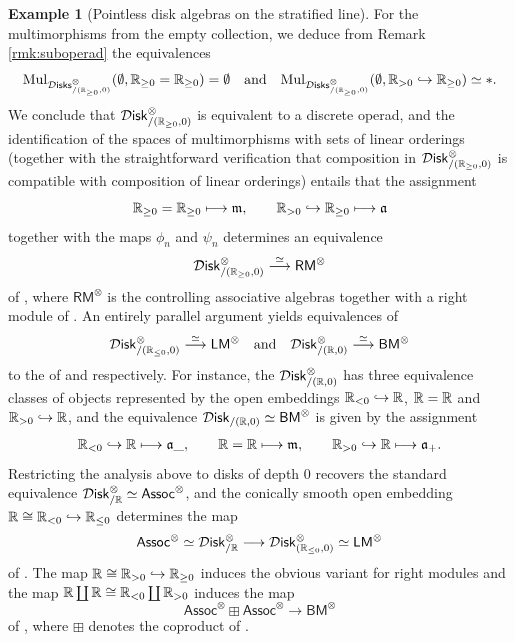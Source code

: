 \documentclass[10pt, reqno, twoside
, final
]{amsart}
\numberwithin{equation}{subsection}%
\theoremstyle{definition}
\theoremstyle{definition}
\theoremstyle{definition}
\theoremstyle{definition}
\theoremstyle{definition}
\theoremstyle{definition}
\theoremstyle{definition}
\theoremstyle{definition}
\theoremstyle{definition}
\theoremstyle{plain}
\theoremstyle{definition}
\theoremstyle{plain}
\theoremstyle{definition}
\theoremstyle{plain}
\theoremstyle{definition}
\theoremstyle{definition}
\theoremstyle{plain}
\theoremstyle{plain}
\theoremstyle{definition}
\newtheorem{ex}[defn]{Example}
\theoremstyle{plain}
\theoremstyle{plain}
\theoremstyle{plain}
\begin{document}
\begin{ex}[Pointless disk algebras on the stratified line]
For the multimorphisms from the empty collection, we deduce from  Remark \ref{rmk:suboperad} the equivalences 
\[ \mathrm{Mul}_{\mathcal{D}\mathsf{isks}^{\otimes}_{/(\mathbb{R}_{\geq 0},0)}}(\emptyset,\mathbb{R}_{\geq 0}=\mathbb{R}_{\geq 0})=\emptyset \quad\text{and}\quad \mathrm{Mul}_{\mathcal{D}\mathsf{isks}^{\otimes}_{/(\mathbb{R}_{\geq 0},0)}}(\emptyset,\mathbb{R}_{> 0}\hookrightarrow \mathbb{R}_{\geq 0})\simeq *.  \]
We conclude that $\mathcal{D}\mathsf{isk}_{/(\mathbb{R}_{\geq 0},0)}^{\otimes}$ is equivalent to a discrete operad, and the identification of the spaces of multimorphisms with sets of linear orderings (together with the straightforward verification that composition in $\mathcal{D}\mathsf{isk}_{/(\mathbb{R}_{\geq 0},0)}^{\otimes}$ is compatible with composition of linear orderings) entails that the assignment
\[  \mathbb{R}_{\geq 0}=\mathbb{R}_{\geq0}\longmapsto \mathfrak{m},\quad \quad \mathbb{R}_{>0}\hookrightarrow \mathbb{R}_{\geq0} \longmapsto \mathfrak{a}  \]
together with the maps $\phi_n$ and $\psi_n$ determines an equivalence
\[ \mathcal{D}\mathsf{isk}_{/(\mathbb{R}_{\geq 0},0)}^{\otimes}\overset{\simeq}{\longrightarrow} \mathsf{RM}^{\otimes} \]
of \infopst, where $\mathsf{RM}^{\otimes}$ is the \infop controlling associative algebras together with a right module of \cite[Variant 4.2.1.36]{LurHA}. An entirely parallel argument yields equivalences of \infops 
\[ \mathcal{D}\mathsf{isk}^{\otimes}_{/(\mathbb{R}_{\leq 0},0)}\overset{\simeq}{\longrightarrow} \mathsf{LM}^{\otimes} \quad\text{and}\quad \mathcal{D}\mathsf{isk}_{/(\mathbb{R},0)}^{\otimes}\overset{\simeq}{\longrightarrow} \mathsf{BM}^{\otimes}  \]
to the \infops of \cite[Definition 4.2.1.1]{LurHA} and \cite[4.3.1.1]{LurHA} respectively. For instance, the \infop $\mathcal{D}\mathsf{isk}^{\otimes}_{/(\mathbb{R},0)}$ has three equivalence classes of objects represented by the open embeddings $\mathbb{R}_{<0}\hookrightarrow \mathbb{R}$, $\mathbb{R}=\mathbb{R}$ and $\mathbb{R}_{>0}\hookrightarrow \mathbb{R}$, and the equivalence $\mathcal{D}\mathsf{isk}_{/(\mathbb{R},0)}\simeq \mathsf{BM}^{\otimes}$ is given by the assignment 
\[ \mathbb{R}_{<0}\hookrightarrow \mathbb{R} \longmapsto \mathfrak{a}\_ ,\quad \quad\mathbb{R}=\mathbb{R}\longmapsto \mathfrak{m},\quad \quad \mathbb{R}_{>0}\hookrightarrow \mathbb{R} \longmapsto \mathfrak{a}_+.  \]
Restricting the analysis above to disks of depth 0 recovers the standard equivalence $\mathcal{D}\mathsf{isk}^{\otimes}_{/\mathbb{R}}\simeq \mathsf{Assoc}^{\otimes}$, and the conically smooth open embedding $\mathbb{R}\cong \mathbb{R}_{<0}\hookrightarrow \mathbb{R}_{\leq 0}$ determines the map 
\[  \mathsf{Assoc}^{\otimes} \simeq \mathcal{D}\mathsf{isk}^{\otimes}_{/\mathbb{R}}\longrightarrow \mathcal{D}\mathsf{isk}^{\otimes}_{(\mathbb{R}_{\leq 0},0)} \simeq \mathsf{LM}^{\otimes}   \]
of \cite[Remark 4.2.1.10]{LurHA}. The map $\mathbb{R}\cong \mathbb{R}_{>0}\hookrightarrow \mathbb{R}_{\geq 0}$ induces the obvious variant for right modules and the map $\mathbb{R}\coprod \mathbb{R}\cong \mathbb{R}_{<0}\coprod \mathbb{R}_{>0}$ induces the \infop map 
\[ \mathsf{Assoc}^{\otimes} \boxplus \mathsf{Assoc}^{\otimes}\longrightarrow \mathsf{BM}^{\otimes}  \]
of \cite[Remark 4.3.1.10]{LurHA}, where $\boxplus$ denotes the coproduct of \infopst. 
\end{ex}
\end{document}
